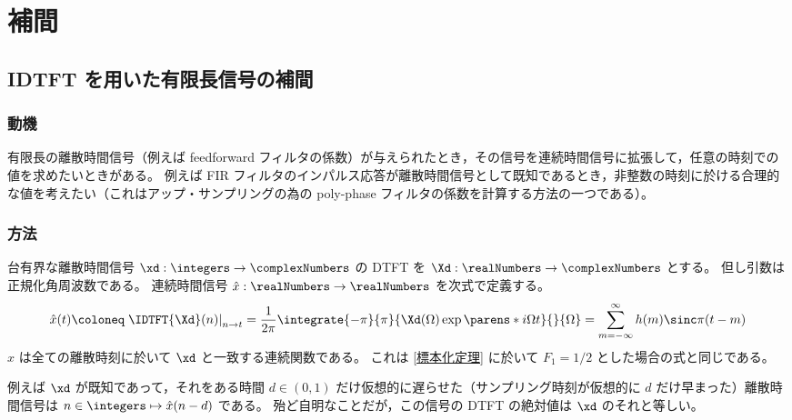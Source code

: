 \chapter{補間}
    \section{IDTFT を用いた有限長信号の補間}
        \label{IDTFT を用いた有限長信号の補間}
        \subsection{動機}
            有限長の離散時間信号（例えば feedforward フィルタの係数）が与えられたとき，その信号を連続時間信号に拡張して，任意の時刻での値を求めたいときがある。
            例えば FIR フィルタのインパルス応答が離散時間信号として既知であるとき，非整数の時刻に於ける合理的な値を考えたい（これはアップ・サンプリングの為の poly-phase フィルタの係数を計算する方法の一つである）。
        \subsection{方法}
            \label{IDTFT を用いた有限長信号の補間>方法}
            台有界な離散時間信号 $\xd:\integers\to\complexNumbers$ の DTFT を $\Xd:\realNumbers\to\complexNumbers$ とする。
            但し引数は正規化角周波数である。
            連続時間信号 $\hat{x}:\realNumbers\to\realNumbers$ を次式で定義する。
            \[ \hat{x}(t)\coloneq\left.\IDTFT{\Xd}(n)\right|_{n\to t} = \frac{1}{2\pi}\integrate{-\pi}{\pi}{\Xd(\Omega)\exp\parens*{i\Omega t}}{}{\Omega} = \sum_{m=-\infty}^\infty h(m)\sinc\pi(t-m) \]
            $\hat{x}$ は全ての離散時刻に於いて $\xd$ と一致する連続関数である。
            これは \ref{標本化定理} に於いて $F_1=1/2$ とした場合の式と同じである。
            \par
            例えば $\xd$ が既知であって，それをある時間 $d\in(0,1)$ だけ仮想的に遅らせた（サンプリング時刻が仮想的に $d$ だけ早まった）離散時間信号は $n\in\integers\mapsto\hat{x}(n-d)$ である。
            殆ど自明なことだが，この信号の DTFT の絶対値は $\xd$ のそれと等しい。
